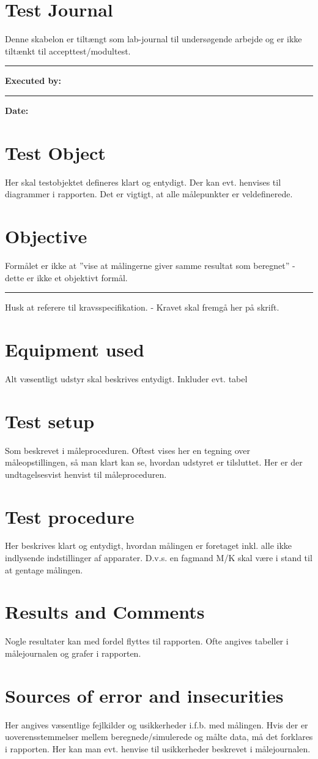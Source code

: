 \chapter*{Test Journal}
Denne skabelon er tiltængt som lab-journal til undersøgende arbejde og er ikke tiltænkt til accepttest/modultest. \plainbreak{0.5}
\textbf{Executed by:} \plainbreak{0.5}
\textbf{Date:}



\chapter{Test Object}
Her skal testobjektet defineres klart og entydigt. Der kan evt. henvises til diagrammer i rapporten.
Det er vigtigt, at alle målepunkter er veldefinerede. 


\chapter{Objective}
Formålet er ikke at ”vise at målingerne giver samme resultat som beregnet” - dette er ikke et objektivt formål.
\plainbreak{0.5}
Husk at referere til kravsspecifikation. - Kravet skal fremgå her på skrift.

\chapter{Equipment used}
Alt væsentligt udstyr skal beskrives entydigt. Inkluder evt. tabel

\chapter{Test setup}
Som beskrevet i måleproceduren. Oftest vises her en tegning over måleopstillingen, så man klart
kan se, hvordan udstyret er tilsluttet. Her er der undtagelsesvist henvist til måleproceduren. 

\chapter{Test procedure}
Her beskrives klart og entydigt, hvordan målingen er foretaget inkl. alle ikke indlysende indstillinger af apparater. D.v.s. en fagmand M/K skal være i stand til at gentage målingen. 

\chapter{Results and Comments}
Nogle resultater kan med fordel flyttes til rapporten. Ofte angives tabeller i målejournalen og grafer i rapporten.

\chapter{Sources of error and insecurities}
Her angives væsentlige fejlkilder og usikkerheder i.f.b. med målingen. Hvis der er uoverensstemmelser mellem beregnede/simulerede og målte data, må det forklares i rapporten. Her kan
man evt. henvise til usikkerheder beskrevet i målejournalen. 
